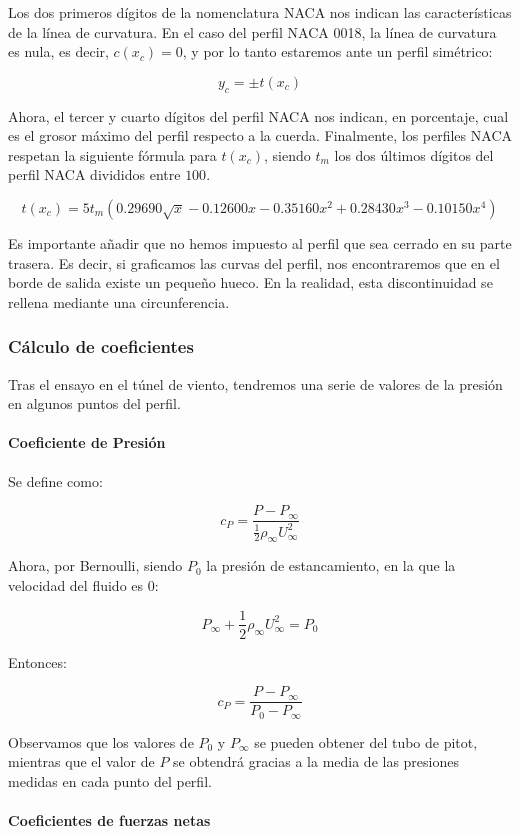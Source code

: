 \documentclass{article}
\begin{document}
Los dos primeros dígitos de la nomenclatura NACA nos indican las características de la línea de curvatura. En el caso del perfil
NACA 0018, la línea de curvatura es nula, es decir, $c(x_c) = 0$, y por lo tanto estaremos ante un perfil simétrico:

$$y_c = \pm t(x_c)$$

Ahora, el tercer y cuarto dígitos del perfil NACA nos indican, en porcentaje, cual es el grosor máximo del perfil respecto
a la cuerda. Finalmente, los perfiles NACA respetan la siguiente fórmula para $t(x_c)$, siendo $t_m$ los
dos últimos dígitos del perfil NACA divididos entre $100$.

$$t(x_c) = 5 t_m (0.29690 \sqrt{x} - 0.12600 x - 0.35160 x^2 + 0.28430 x^3 - 0.10150 x^4)$$

Es importante añadir que no hemos impuesto al perfil que sea cerrado en su parte trasera. 
Es decir, si graficamos las curvas del perfil, nos encontraremos que en el borde de salida existe un pequeño hueco. 
En la realidad, esta discontinuidad se rellena mediante una circunferencia. \cite{Jacobs1932TheCO}

\subsubsection{Cálculo de coeficientes}

Tras el ensayo en el túnel de viento, tendremos una serie de valores de la presión en algunos puntos del perfil.

\paragraph{Coeficiente de Presión}

Se define como:

$$c_P = \frac{P - P_{\infty}}{\frac{1}{2}\rho_{\infty} U^2_{\infty}}$$

Ahora, por Bernoulli, siendo $P_0$ la presión de estancamiento, en la que la velocidad del fluido es 0:

$$P_{\infty} + \frac{1}{2} \rho_{\infty} U^2_{\infty} = P_0$$

Entonces:

$$c_P = \frac{P - P_{\infty}}{P_0 - P_{\infty}}$$

Observamos que los valores de $P_0$ y $P_{\infty}$ se pueden obtener del tubo de pitot, mientras que el valor de
$P$ se obtendrá gracias a la media de las presiones medidas en cada punto del perfil.

\paragraph{Coeficientes de fuerzas netas}
\end{document}
